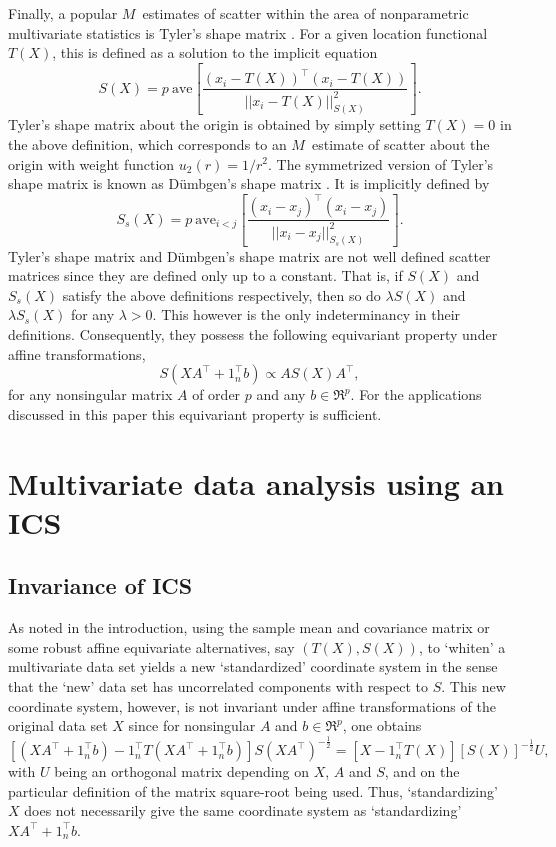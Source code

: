 \documentclass[article,nojss]{jss}
\newcommand{\ave}{\mathrm{ave}}
\begin{document}
Finally, a popular $M$~estimates of scatter within the area of nonparametric multivariate statistics is Tyler's shape
matrix \citep{Tyler1987}.  For a given location functional $T(X)$, this is defined as a solution to the implicit equation
\[
S(X)= p\ \ave\left[\frac{(x_i-T(X))^\top (x_i-T(X))}{||x_i-T(X)||_{S(X)}^{2}} \right].
\]
Tyler's shape matrix about the origin is obtained by simply setting $T(X) = 0$ in the above definition, which corresponds
to an $M$~estimate of scatter about the origin with weight function $u_2(r) = 1/r^2$. The symmetrized version of Tyler's
shape matrix is known as D\"umbgen's shape matrix \citep{Dumbgen1998}. It is implicitly defined by
\[
S_s(X)= p\ \ave_{i<j}\left[\frac{(x_i-x_j)^\top (x_i-x_j)}{||x_i-x_j||_{S_s(X)}^{2}} \right].
\]
Tyler's shape matrix and D\"umbgen's shape matrix are not well defined scatter matrices since they are defined only up
to a constant. That is, if $S(X)$ and $S_s(X)$ satisfy the above definitions respectively, then so do $\lambda S(X)$ and
$\lambda S_s(X)$ for any $\lambda > 0$.  This however is the only indeterminancy in their definitions. Consequently, they
possess the following equivariant property under affine transformations,
\[
S(XA^\top +1_n^\top b) \propto AS(X)A^\top,
\]
for any nonsingular matrix $A$ of order $p$ and any $b \in \Re^p$. For the applications discussed in this paper this
equivariant property is sufficient.

\section{Multivariate data analysis using an ICS}\label{MAD}

\subsection{Invariance of ICS}\label{ICS}

As noted in the introduction, using the sample mean and covariance matrix or some robust affine equivariate alternatives, say
$(T(X),S(X))$, to `whiten' a multivariate data set yields a new `standardized' coordinate system in the sense that the `new' data
set has uncorrelated components with respect to $S$. This new coordinate system, however, is not invariant under affine
transformations of the original data set $X$ since for nonsingular $A$ and $b \in \Re^p$, one obtains
\[
 [(XA^\top +1_n^\top b)-1_n^\top T(XA^\top +1_n^\top b)]S(XA^\top)^{-\frac{1}{2}} = [X - 1_n^\top T(X)][S(X)]^{-\frac{1}{2}}U,
\]
with $U$ being an orthogonal matrix depending on $X$, $A$ and $S$, and on the particular definition of the matrix square-root
being used. Thus, `standardizing' $X$ does not necessarily give the same coordinate system as `standardizing' $XA^\top +1_n^\top b$.
\end{document}
